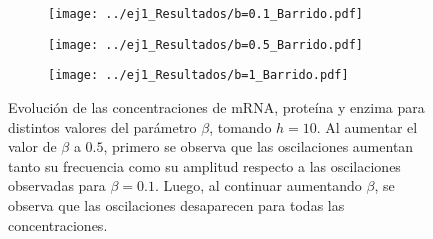 \begin{figure}[htb!]
    \centering
    \begin{subfigure}[b]{0.49\textwidth}
        \texttt{[image: ../ej1\_Resultados/b=0.1\_Barrido.pdf]}
    \end{subfigure}
    \begin{subfigure}[b]{0.49\textwidth}
        \texttt{[image: ../ej1\_Resultados/b=0.5\_Barrido.pdf]}
    \end{subfigure}
    \begin{subfigure}[b]{0.49\textwidth}
        \texttt{[image: ../ej1\_Resultados/b=1\_Barrido.pdf]}
    \end{subfigure}
    \caption{Evolución de las concentraciones de mRNA, proteína y enzima para distintos valores del parámetro $\beta$, tomando $h=10$. Al aumentar el valor de $\beta$ a $0.5$, primero se observa que las oscilaciones aumentan tanto su frecuencia como su amplitud respecto a las oscilaciones observadas para $\beta=0.1$. Luego, al continuar aumentando $\beta$, se observa que las oscilaciones desaparecen para todas las concentraciones.}
    \label{ej1:concentraciones_barrido_b}
\end{figure}
